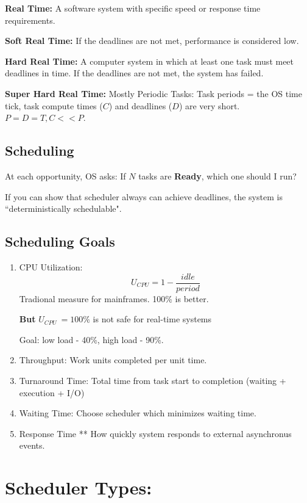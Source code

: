 \documentclass{article}	%
\begin{document}
{\bf Real Time:}  A software system with specific speed or response
time requirements.

{\bf Soft Real Time:} If the deadlines are not met,
performance is considered low.

{\bf Hard Real Time:} A computer system in which at least one task must meet
deadlines in time.  If the deadlines are not met, the system has failed.

{\bf Super Hard Real Time:} Mostly Periodic Tasks:
Task periods = the OS time tick, task compute times ($C$) and
deadlines ($D$) are very
short. $P = D = T, C << P$.

\subsection{Scheduling}

At each opportunity, OS asks:
If $N$ tasks are {\bf Ready}, which one should I run?

If you can show that scheduler always can achieve deadlines, 
the system is ``deterministically schedulable".


\subsection{Scheduling Goals}
\begin{enumerate}
\item CPU Utilization:
\[
U_{CPU} = 1 - \frac{idle}{period}
\]
Tradional measure for mainframes.  100\% is better.

{\bf But} $U_{CPU} ~= 100\%$ is not safe for real-time systems

Goal:   low load - 40\%, high load - 90\%.

\item Throughput: 
Work units completed per unit time.

\item Turnaround Time:
Total time from task start to completion (waiting + execution + I/O)

\item Waiting Time: 
Choose scheduler which minimizes waiting time. 

\item Response Time **
How quickly system responds to external asynchronus events. 
\end{enumerate}


\section*{Scheduler Types:}
\end{document}
